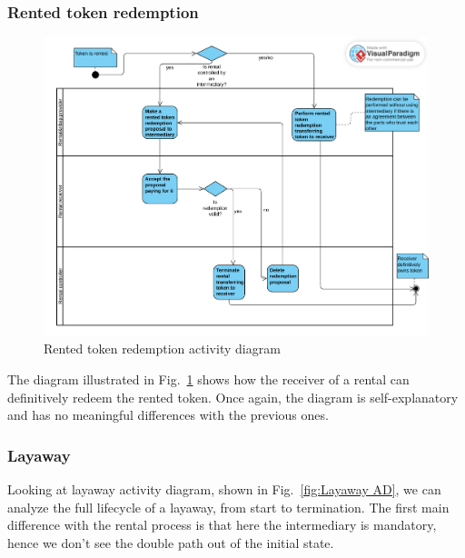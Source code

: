 \documentclass[english, LaM, oneside]{sapthesis}%
\begin{document}
\subsubsection{Rented token redemption}

\begin{figure}[H]
    \centering
        \begin{adjustbox}{width=1\textwidth}
            \includegraphics{ActivityDiagrams/activity_rentedTokenRedemption.pdf} 
        \end{adjustbox}
    \caption{Rented token redemption activity diagram}
    \label{fig:RentedTokenRedemption AD}
\end{figure}

The diagram illustrated in Fig.~\ref{fig:RentedTokenRedemption AD} shows how the receiver of a rental can definitively redeem the rented token. Once again, the diagram is self-explanatory and has no meaningful differences with the previous ones.

\subsubsection{Layaway}

Looking at layaway activity diagram, shown in Fig.~\ref{fig:Layaway AD}, we can analyze the full lifecycle of a layaway, from start to termination. The first main difference with the rental process is that here the intermediary is mandatory, hence we don't see the double path out of the initial state.
\end{document}
